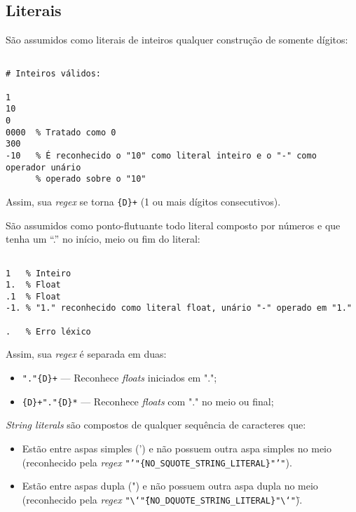 \documentclass[headings=standardclasses, headings=big]{scrreprt}
\begin{document}
\subsection{Literais}

\begin{minipage}{\textwidth}
São assumidos como literais de inteiros qualquer construção de somente dígitos:

\begin{verbatim}

# Inteiros válidos:

1
10
0
0000  % Tratado como 0
300
-10   % É reconhecido o "10" como literal inteiro e o "-" como operador unário
      % operado sobre o "10"

\end{verbatim}

Assim, sua \textit{regex} se torna \texttt{\{D\}+} (1 ou mais dígitos
consecutivos).
\end{minipage}

\begin{minipage}{\textwidth}
São assumidos como ponto-flutuante todo literal composto por números e que
tenha um ``.'' no início, meio ou fim do literal:

\begin{verbatim}

1   % Inteiro
1.  % Float
.1  % Float
-1. % "1." reconhecido como literal float, unário "-" operado em "1."

.   % Erro léxico

\end{verbatim}

Assim, sua \textit{regex} é separada em duas:

\begin{itemize}
    \item \texttt{"."\{D\}+} --- Reconhece \textit{floats} iniciados em ".";
    \item \texttt{\{D\}+"."\{D\}*} --- Reconhece \textit{floats} com "." no
        meio ou final;
\end{itemize}
\end{minipage}

\vspace{1em}

\begin{minipage}{\textwidth}
    \textit{String literals} são compostos de qualquer sequência de caracteres que:
    \begin{itemize}
        \item Estão entre aspas simples (') e não possuem outra aspa simples no
            meio (reconhecido pela \textit{regex}
            \texttt{"'"\{NO\_SQUOTE\_STRING\_LITERAL\}"'"}).
        \item Estão entre aspas dupla (") e não possuem outra aspa dupla no
            meio (reconhecido pela \textit{regex}
            \texttt{"\textbackslash\char`\""\{NO\_DQUOTE\_STRING\_LITERAL\}"\textbackslash\char`\""}).
    \end{itemize}
\end{minipage}
\end{document}
